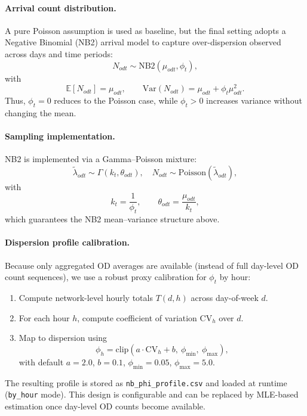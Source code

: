 \paragraph{Arrival count distribution.}
A pure Poisson assumption is used as baseline, but the final setting adopts a Negative Binomial (NB2) arrival model to capture over-dispersion observed across days and time periods:
\begin{equation}
N_{odt} \sim \mathrm{NB2}(\mu_{odt}, \phi_t),
\end{equation}
with
\begin{equation}
\mathbb{E}[N_{odt}] = \mu_{odt}, \qquad
\mathrm{Var}(N_{odt}) = \mu_{odt} + \phi_t \mu_{odt}^2.
\end{equation}
Thus, $\phi_t=0$ reduces to the Poisson case, while $\phi_t>0$ increases variance without changing the mean.

\paragraph{Sampling implementation.}
NB2 is implemented via a Gamma--Poisson mixture:
\begin{equation}
\tilde{\lambda}_{odt} \sim \Gamma(k_t,\theta_{odt}), \quad
N_{odt} \sim \mathrm{Poisson}(\tilde{\lambda}_{odt}),
\end{equation}
with
\begin{equation}
k_t=\frac{1}{\phi_t}, \qquad \theta_{odt}=\frac{\mu_{odt}}{k_t},
\end{equation}
which guarantees the NB2 mean--variance structure above.

\paragraph{Dispersion profile calibration.}
Because only aggregated OD averages are available (instead of full day-level OD count sequences), we use a robust proxy calibration for $\phi_t$ by hour:
\begin{enumerate}
\item Compute network-level hourly totals $T(d,h)$ across day-of-week $d$.
\item For each hour $h$, compute coefficient of variation $\mathrm{CV}_h$ over $d$.
\item Map to dispersion using
\begin{equation}
\phi_h = \mathrm{clip}(a\cdot \mathrm{CV}_h + b,\ \phi_{\min},\ \phi_{\max}),
\end{equation}
with default $a=2.0$, $b=0.1$, $\phi_{\min}=0.05$, $\phi_{\max}=5.0$.
\end{enumerate}
The resulting profile is stored as \texttt{nb\_phi\_profile.csv} and loaded at runtime (\texttt{by\_hour} mode).  
This design is configurable and can be replaced by MLE-based estimation once day-level OD counts become available.

